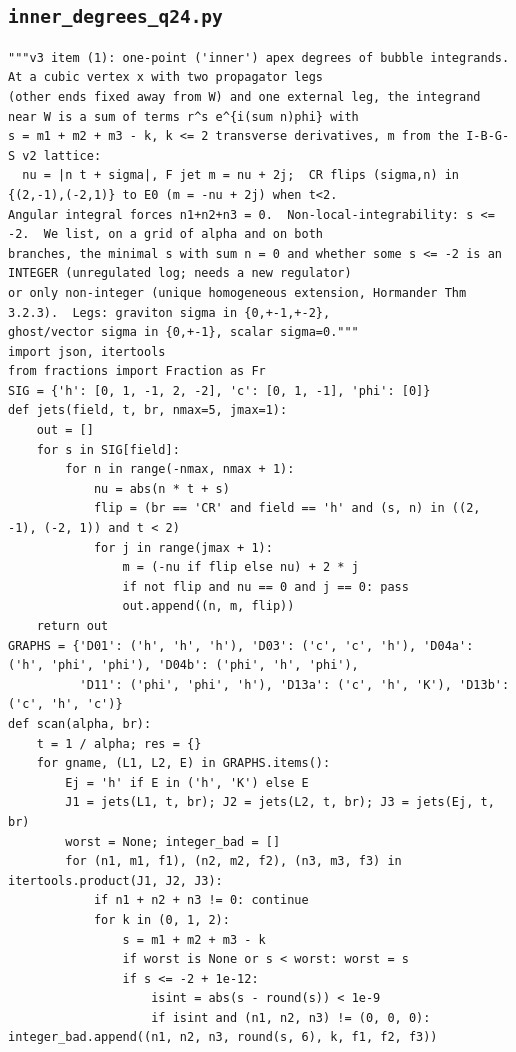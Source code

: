 \documentclass[10pt]{article}
\begin{document}
\subsection{\texttt{inner\_degrees\_q24.py}}
\begin{lstlisting}
"""v3 item (1): one-point ('inner') apex degrees of bubble integrands.  At a cubic vertex x with two propagator legs
(other ends fixed away from W) and one external leg, the integrand near W is a sum of terms r^s e^{i(sum n)phi} with
s = m1 + m2 + m3 - k, k <= 2 transverse derivatives, m from the I-B-G-S v2 lattice:
  nu = |n t + sigma|, F jet m = nu + 2j;  CR flips (sigma,n) in {(2,-1),(-2,1)} to E0 (m = -nu + 2j) when t<2.
Angular integral forces n1+n2+n3 = 0.  Non-local-integrability: s <= -2.  We list, on a grid of alpha and on both
branches, the minimal s with sum n = 0 and whether some s <= -2 is an INTEGER (unregulated log; needs a new regulator)
or only non-integer (unique homogeneous extension, Hormander Thm 3.2.3).  Legs: graviton sigma in {0,+-1,+-2},
ghost/vector sigma in {0,+-1}, scalar sigma=0."""
import json, itertools
from fractions import Fraction as Fr
SIG = {'h': [0, 1, -1, 2, -2], 'c': [0, 1, -1], 'phi': [0]}
def jets(field, t, br, nmax=5, jmax=1):
    out = []
    for s in SIG[field]:
        for n in range(-nmax, nmax + 1):
            nu = abs(n * t + s)
            flip = (br == 'CR' and field == 'h' and (s, n) in ((2, -1), (-2, 1)) and t < 2)
            for j in range(jmax + 1):
                m = (-nu if flip else nu) + 2 * j
                if not flip and nu == 0 and j == 0: pass
                out.append((n, m, flip))
    return out
GRAPHS = {'D01': ('h', 'h', 'h'), 'D03': ('c', 'c', 'h'), 'D04a': ('h', 'phi', 'phi'), 'D04b': ('phi', 'h', 'phi'),
          'D11': ('phi', 'phi', 'h'), 'D13a': ('c', 'h', 'K'), 'D13b': ('c', 'h', 'c')}
def scan(alpha, br):
    t = 1 / alpha; res = {}
    for gname, (L1, L2, E) in GRAPHS.items():
        Ej = 'h' if E in ('h', 'K') else E
        J1 = jets(L1, t, br); J2 = jets(L2, t, br); J3 = jets(Ej, t, br)
        worst = None; integer_bad = []
        for (n1, m1, f1), (n2, m2, f2), (n3, m3, f3) in itertools.product(J1, J2, J3):
            if n1 + n2 + n3 != 0: continue
            for k in (0, 1, 2):
                s = m1 + m2 + m3 - k
                if worst is None or s < worst: worst = s
                if s <= -2 + 1e-12:
                    isint = abs(s - round(s)) < 1e-9
                    if isint and (n1, n2, n3) != (0, 0, 0): integer_bad.append((n1, n2, n3, round(s, 6), k, f1, f2, f3))

\end{lstlisting}
\end{document}
